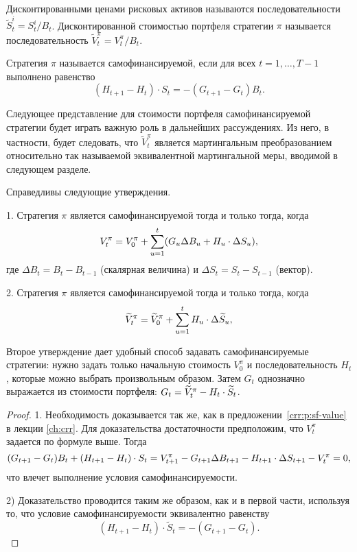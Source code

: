 Дисконтированными ценами рисковых активов называются последовательности $\tilde S_t^i = S_t^i/B_t$. 
Дисконтированной стоимостью портфеля стратегии $\pi$ называется последовательность $\tilde V_t^\pi = V_t^\pi/B_t$. 

Стратегия $\pi$ называется самофинансируемой, если для всех $t=1,\dots,T-1$ выполнено равенство
\[
(H_{t+1} - H_t)\cdot S_t = -(G_{t+1} - G_t)B_t.
\]

Следующее представление для стоимости портфеля самофинансируемой стратегии будет играть важную роль в дальнейших рассуждениях.
Из него, в частности, будет следовать, что $\tilde V_t^\pi$ является мартингальным преобразованием относительно так называемой эквивалентной мартингальной меры, вводимой в следующем разделе.

\begin{proposition}
Справедливы следующие утверждения.

\label{gen:p:sf}
1. Стратегия $\pi$ является самофинансируемой тогда и только тогда, когда
\[
V_t^\pi = V_0^\pi + \sum_{u=1}^t (G_u\Delta B_u + {H_u}\cdot{\Delta S_u}),
\]
где $\Delta B_t = B_{t} - B_{t-1}$ (скалярная величина) и $\Delta S_t = S_t - S_{t-1}$ (вектор).

2. Стратегия $\pi$ является самофинансируемой тогда и только тогда, когда
\begin{equation}
\label{gen:sf-discounted-value}
\widetilde V_t^\pi = \widetilde V_0^\pi + \sum_{u=1}^t {H_u}\cdot{\Delta \widetilde S_u},
\end{equation}
\end{proposition}

\begin{remark}
\label{gen:r:sf-construction}
Второе утверждение дает удобный способ задавать самофинансируемые стратегии: нужно задать только начальную стоимость $V_0^\pi$ и последовательность $H_t$, которые можно выбрать произвольным образом. 
Затем $G_t$ однозначно выражается из стоимости портфеля: $G_t = \widetilde V_t^\pi - {H_t}\cdot{\widetilde S_t}$.
\end{remark}

\begin{proof}
1. Необходимость доказывается так же, как в предложении~\ref{crr:p:sf-value} в лекции \ref{ch:crr}.
Для доказательства достаточности предположим, что $V_t^\pi$ задается по формуле выше.
Тогда
\[
(G_{t+1} - G_t)B_t + (H_{t+1} - H_t)\cdot S_t = 
V_{t+1}^\pi - G_{t+1}\Delta B_{t+1} - {H_{t+1}}\cdot{\Delta S_{t+1}} - V_t^\pi = 0,
\]
что влечет выполнение условия самофинансируемости.

2) Доказательство проводится таким же образом, как и в первой части, используя то, что условие самофинансируемости эквивалентно равенству
\[
(H_{t+1} - H_t)\cdot \tilde S_t = -(G_{t+1} - G_t).
\]
\end{proof}


